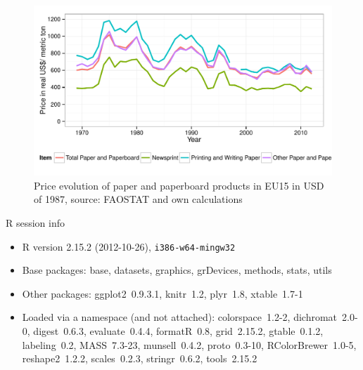 \documentclass{scrartcl}\usepackage{graphicx, color}
\newenvironment{knitrout}{}{} %
\begin{document}
\begin{knitrout}
\color{fgcolor}\begin{figure}[h]


{\centering \includegraphics[width=.7\linewidth]{figure/PriceEU15Extended} 

}

\caption[Price evolution of paper and paperboard products in EU15 in USD of 1987, source]{Price evolution of paper and paperboard products in EU15 in USD of 1987, source: FAOSTAT and own calculations\label{fig:PriceEU15Extended}}
\end{figure}


\end{knitrout}



\newpage
R session info
\begin{itemize}\raggedright
  \item R version 2.15.2 (2012-10-26), \verb|i386-w64-mingw32|
  \item Base packages: base, datasets, graphics, grDevices,
    methods, stats, utils
  \item Other packages: ggplot2~0.9.3.1, knitr~1.2, plyr~1.8,
    xtable~1.7-1
  \item Loaded via a namespace (and not attached):
    colorspace~1.2-2, dichromat~2.0-0, digest~0.6.3,
    evaluate~0.4.4, formatR~0.8, grid~2.15.2, gtable~0.1.2,
    labeling~0.2, MASS~7.3-23, munsell~0.4.2, proto~0.3-10,
    RColorBrewer~1.0-5, reshape2~1.2.2, scales~0.2.3,
    stringr~0.6.2, tools~2.15.2
\end{itemize}
\end{document}
